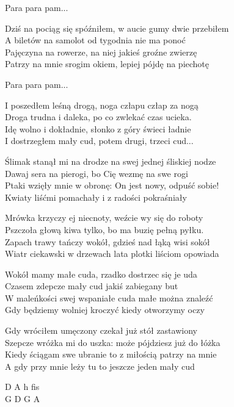 \begin{text}
    Para para pam...
	
    Dziś na pociąg się spóźniłem, w aucie gumy dwie przebiłem\\
    A biletów na samolot od tygodnia nie ma ponoć\\
    Pajęczyna na rowerze, na niej jakieś groźne zwierzę\\
    Patrzy na mnie srogim okiem, lepiej pójdę na piechotę

    Para para pam...

    I poszedłem leśną drogą, noga człapu człap za nogą\\
    Droga trudna i daleka, po co zwlekać czas ucieka.\\
    Idę wolno i dokładnie, słonko z góry świeci ładnie\\
    I dostrzegłem mały cud, potem drugi, trzeci cud...

    Ślimak stanął mi na drodze na swej jednej śliskiej nodze\\
    Dawaj sera na pierogi, bo Cię wezmę na swe rogi\\
    Ptaki wzięły mnie w obronę: On jest nowy, odpuść sobie!\\
    Kwiaty liśćmi pomachały i z radości pokraśniały

    Mrówka krzyczy ej niecnoty, weźcie wy się do roboty\\
    Pszczoła głową kiwa tylko, bo ma buzię pełną pyłku.\\
    Zapach trawy tańczy wokół, gdzieś nad łąką wisi sokół\\
    Wiatr ciekawski w drzewach lata plotki liściom opowiada

    Wokół mamy małe cuda, rzadko dostrzec się je uda\\
    Czasem zdepcze mały cud jakiś zabiegany but\\
    W maleńkości swej wspaniałe cuda małe można znaleźć\\
    Gdy będziemy wolniej kroczyć kiedy otworzymy oczy

    Gdy wróciłem umęczony czekał już stół zastawiony\\
    Szepcze wróżka mi do uszka: może pójdziesz już do łóżka\\
    Kiedy ściągam swe ubranie to z miłością patrzy na mnie\\
    A gdy przy mnie leży tu to jeszcze jeden mały cud

\end{text}
\begin{chord}
    D A h fis\\
	G D G A
\end{chord}